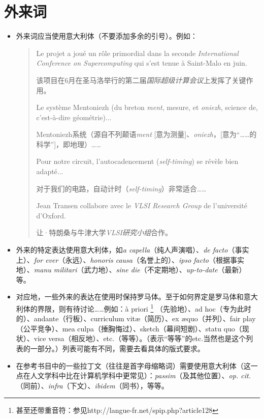 \section{外来词}

\begin{itemize}
    \item 外来词应当使用意大利体（不要添加多余的引号）。例如：
    \begin{quote}
        Le projet a joué un rôle primordial dans la seconde \emph{International Conference on Supercomputing} qui s'est tenue à Saint-Malo en juin.
        \begin{bil}
            该项目在6月在圣马洛举行的第二届\emph{国际超级计算会议}上发挥了关键作用。
        \end{bil}

        Le système Mentoniezh (du breton \emph{ment}, mesure, et \emph{oniezh}, science de, c'est-à-dire géométrie)...
        \begin{bil}
            Mentoniezh系统（源自不列颠语\emph{ment} [意为测量]、\emph{oniezh}，[意为``……的科学'']，即地理）……
        \end{bil}

        Pour notre circuit, l'autocadencement (\emph{self-timing}) se révèle bien adapté...
        \begin{bil}
            对于我们的电路，自动计时（\emph{self-timing}）非常适合……
        \end{bil}

        Jean Transen collabore avec le \emph{VLSI Research Group} de l'université d'Oxford.
        \begin{bil}
            让·特朗桑与牛津大学\emph{VLSI研究小组}合作。
        \end{bil}
    \end{quote}
    \item 外来的特定表达使用意大利体，如\emph{a capella}（纯人声演唱）、\emph{de facto}（事实上）、\emph{for ever}（永远）、\emph{honoris causa}（名誉上的）、\emph{ipso facto}（根据事实地）、\emph{manu militari}（武力地）、\emph{sine die}（不定期地）、\emph{up-to-date}（最新）等。
    \item 对应地，一些外来的表达在使用时保持罗马体。至于如何界定是罗马体和意大利体的界限，则有待讨论……例如：à priori
        \footnote{甚至还带重音符：参见http://langue-fr.net/spip.php?article128}
    （先验地）、ad hoc（专为此时的）、andante（行板）、curriculum vitæ（简历）、ex æquo（并列）、fair play（公平竞争）、mea culpa（捶胸悔过）、sketch（幕间短剧）、statu quo（现状）、vice versa（相反地）、etc.（等等）。（表示``等等''的etc.当然也是这个列表的一部分。）列表可能有不同，需要去看具体的版式要求。
    \item 在参考书目中的一些拉丁文（往往是首字母缩略词）需要使用意大利体（这一点在人文学科中比在计算机学科中更常见）：\emph{passim}（及其他位置）、\emph{op. cit.}（同前）、\emph{infra}（下文）、\emph{ibidem}（同书），等等。
\end{itemize}

